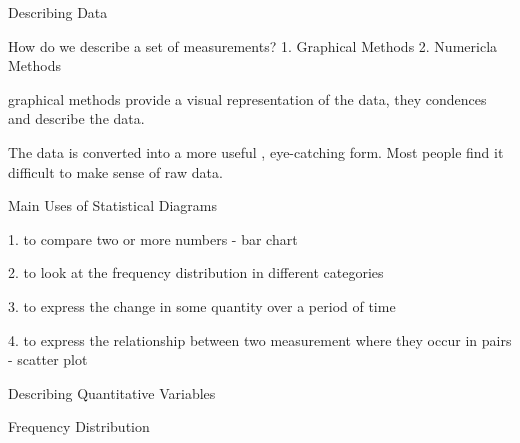 
Describing Data


How do we describe a set of measurements?
1. Graphical Methods
2. Numericla Methods




graphical methods provide a visual representation of the data, they condences and describe the data.

The data is converted into a more useful , eye-catching form. Most people find it difficult to make sense of raw data.




Main Uses of Statistical Diagrams

1. to compare two or more numbers - bar chart

2. to look at the frequency distribution in different categories

3. to express the change in some quantity over a period of time

4. to express the relationship between two measurement where they occur in pairs - scatter plot


Describing Quantitative Variables

Frequency Distribution



